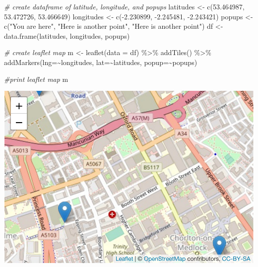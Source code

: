 \documentclass[
]{book}
\newenvironment{Shaded}{\begin{snugshade}}{\end{snugshade}}
\newcommand{\AttributeTok}[1]{\textcolor[rgb]{0.77,0.63,0.00}{#1}}
\newcommand{\CommentTok}[1]{\textcolor[rgb]{0.56,0.35,0.01}{\textit{#1}}}
\newcommand{\FloatTok}[1]{\textcolor[rgb]{0.00,0.00,0.81}{#1}}
\newcommand{\FunctionTok}[1]{\textcolor[rgb]{0.00,0.00,0.00}{#1}}
\newcommand{\NormalTok}[1]{#1}
\newcommand{\OtherTok}[1]{\textcolor[rgb]{0.56,0.35,0.01}{#1}}
\newcommand{\SpecialCharTok}[1]{\textcolor[rgb]{0.00,0.00,0.00}{#1}}
\newcommand{\StringTok}[1]{\textcolor[rgb]{0.31,0.60,0.02}{#1}}
\begin{document}
\begin{Shaded}
\begin{Highlighting}[]
\CommentTok{\# create dataframe of latitude, longitude, and popups}
\NormalTok{latitudes }\OtherTok{\textless{}{-}} \FunctionTok{c}\NormalTok{(}\FloatTok{53.464987}\NormalTok{, }\FloatTok{53.472726}\NormalTok{, }\FloatTok{53.466649}\NormalTok{) }
\NormalTok{longitudes }\OtherTok{\textless{}{-}} \FunctionTok{c}\NormalTok{(}\SpecialCharTok{{-}}\FloatTok{2.230899}\NormalTok{, }\SpecialCharTok{{-}}\FloatTok{2.245481}\NormalTok{, }\SpecialCharTok{{-}}\FloatTok{2.243421}\NormalTok{) }
\NormalTok{popups }\OtherTok{\textless{}{-}} \FunctionTok{c}\NormalTok{(}\StringTok{"You are here"}\NormalTok{, }
           \StringTok{"Here is another point"}\NormalTok{, }
           \StringTok{"Here is another point"}\NormalTok{) }
\NormalTok{df }\OtherTok{\textless{}{-}} \FunctionTok{data.frame}\NormalTok{(latitudes, longitudes, popups)      }

\CommentTok{\# create leaflet map}
\NormalTok{m }\OtherTok{\textless{}{-}} \FunctionTok{leaflet}\NormalTok{(}\AttributeTok{data =}\NormalTok{ df) }\SpecialCharTok{\%\textgreater{}\%}
  \FunctionTok{addTiles}\NormalTok{()  }\SpecialCharTok{\%\textgreater{}\%}  
  \FunctionTok{addMarkers}\NormalTok{(}\AttributeTok{lng=}\SpecialCharTok{\textasciitilde{}}\NormalTok{longitudes, }\AttributeTok{lat=}\SpecialCharTok{\textasciitilde{}}\NormalTok{latitudes, }\AttributeTok{popup=}\SpecialCharTok{\textasciitilde{}}\NormalTok{popups)}

\CommentTok{\#print leaflet map}
\NormalTok{m  }
\end{Highlighting}
\end{Shaded}

\includegraphics{crime_mapping_files/figure-latex/unnamed-chunk-50-1.pdf}
\end{document}
